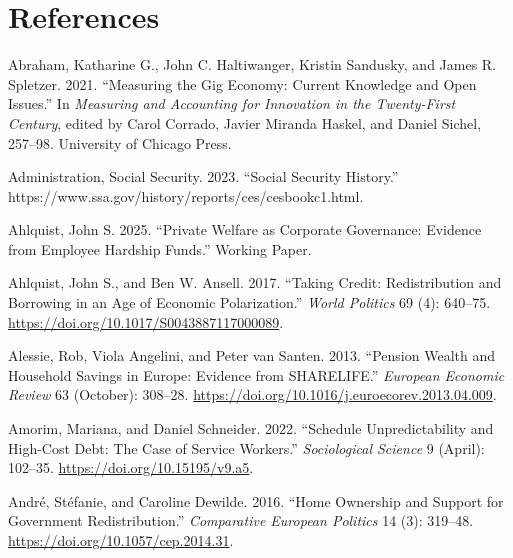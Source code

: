 \documentclass[
  11pt,
  oneside]{article}
\newlength{\cslhangindent}
\newenvironment{CSLReferences}[2] %
 {\begin{list}{}{%
  \setlength{\itemindent}{0pt}
  \setlength{\leftmargin}{0pt}
  \setlength{\parsep}{0pt}
  \ifodd #1
   \setlength{\leftmargin}{\cslhangindent}
   \setlength{\itemindent}{-1\cslhangindent}
  \fi
  \setlength{\itemsep}{#2\baselineskip}}}
 {\end{list}}
\begin{document}
\section*{References}\label{references}

\label{refs}
\begin{CSLReferences}{1}{0}
Abraham, Katharine G., John C. Haltiwanger, Kristin Sandusky, and James R. Spletzer. 2021. {``Measuring the {Gig Economy}: {Current Knowledge} and {Open Issues}.''} In \emph{Measuring and {Accounting} for {Innovation} in the {Twenty-First Century}}, edited by Carol Corrado, Javier Miranda Haskel, and Daniel Sichel, 257--98. University of Chicago Press.

Administration, Social Security. 2023. {``Social {Security History}.''} https://www.ssa.gov/history/reports/ces/cesbookc1.html.

Ahlquist, John S. 2025. {``Private {Welfare} as {Corporate Governance}: {Evidence} from {Employee Hardship Funds}.''} Working Paper.

Ahlquist, John S., and Ben W. Ansell. 2017. {``Taking {Credit}: {Redistribution} and {Borrowing} in an {Age} of {Economic Polarization}.''} \emph{World Politics} 69 (4): 640--75. \url{https://doi.org/10.1017/S0043887117000089}.

Alessie, Rob, Viola Angelini, and Peter van Santen. 2013. {``Pension Wealth and Household Savings in {Europe}: {Evidence} from {SHARELIFE}.''} \emph{European Economic Review} 63 (October): 308--28. \url{https://doi.org/10.1016/j.euroecorev.2013.04.009}.

Amorim, Mariana, and Daniel Schneider. 2022. {``Schedule {Unpredictability} and {High-Cost Debt}: {The Case} of {Service Workers}.''} \emph{Sociological Science} 9 (April): 102--35. \url{https://doi.org/10.15195/v9.a5}.

André, Stéfanie, and Caroline Dewilde. 2016. {``Home Ownership and Support for Government Redistribution.''} \emph{Comparative European Politics} 14 (3): 319--48. \url{https://doi.org/10.1057/cep.2014.31}.


\end{CSLReferences}
\end{document}
